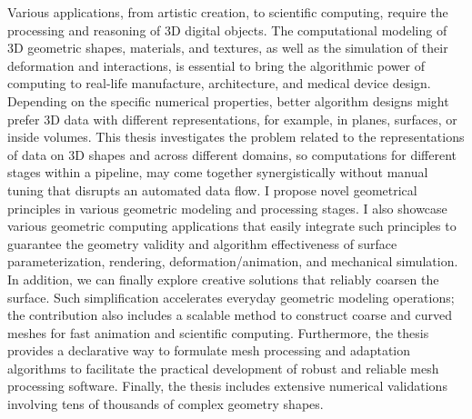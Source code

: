 Various applications, from artistic creation, to scientific computing, require the processing and reasoning of 3D digital objects.
The computational modeling of 3D geometric shapes, materials, and textures, as well as the simulation of their deformation and interactions, is essential to bring the algorithmic power of computing to real-life manufacture, architecture, and medical device design.
Depending on the specific numerical properties, better algorithm designs might prefer 3D data with different representations, for example, in planes, surfaces, or inside volumes.
This thesis investigates the problem related to the representations of data on 3D shapes and across different domains,
so computations for different stages within a pipeline, may come together synergistically without manual tuning that disrupts an automated data flow.
I propose novel geometrical principles in various geometric modeling and processing stages.
I also showcase various geometric computing applications that easily integrate such principles to guarantee the geometry validity and algorithm effectiveness of surface parameterization, rendering, deformation/animation, and mechanical simulation.
In addition, we can finally explore creative solutions that reliably coarsen the surface. Such simplification accelerates everyday geometric modeling operations; the contribution also includes a scalable method to construct coarse and curved meshes for fast animation and scientific computing.
Furthermore, the thesis provides a declarative way to formulate mesh processing and adaptation algorithms to facilitate the practical development of robust and reliable mesh processing software.
Finally, the thesis includes extensive numerical validations involving tens of thousands of complex geometry shapes. %
